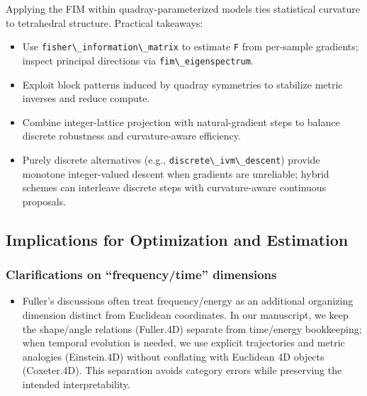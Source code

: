 \documentclass[
  10pt,
]{article}
\newcommand{\passthrough}[1]{#1}
\providecommand{\tightlist}{%
  \setlength{\itemsep}{0pt}\setlength{\parskip}{0pt}}
\begin{document}
Applying the FIM within quadray-parameterized models ties statistical
curvature to tetrahedral structure. Practical takeaways:

\begin{itemize}
\tightlist
\item
  Use \passthrough{\lstinline!fisher\_information\_matrix!} to estimate
  \passthrough{\lstinline!F!} from per-sample gradients; inspect
  principal directions via \passthrough{\lstinline!fim\_eigenspectrum!}.
\item
  Exploit block patterns induced by quadray symmetries to stabilize
  metric inverses and reduce compute.
\item
  Combine integer-lattice projection with natural-gradient steps to
  balance discrete robustness and curvature-aware efficiency.
\item
  Purely discrete alternatives (e.g.,
  \passthrough{\lstinline!discrete\_ivm\_descent!}) provide monotone
  integer-valued descent when gradients are unreliable; hybrid schemes
  can interleave discrete steps with curvature-aware continuous
  proposals.
\end{itemize}

\hypertarget{implications-for-optimization-and-estimation}{%
\subsection{Implications for Optimization and
Estimation}\label{implications-for-optimization-and-estimation}}

\hypertarget{clarifications-on-frequencytime-dimensions}{%
\subsubsection{Clarifications on ``frequency/time''
dimensions}\label{clarifications-on-frequencytime-dimensions}}

\begin{itemize}
\tightlist
\item
  Fuller's discussions often treat frequency/energy as an additional
  organizing dimension distinct from Euclidean coordinates. In our
  manuscript, we keep the shape/angle relations (Fuller.4D) separate
  from time/energy bookkeeping; when temporal evolution is needed, we
  use explicit trajectories and metric analogies (Einstein.4D) without
  conflating with Euclidean 4D objects (Coxeter.4D). This separation
  avoids category errors while preserving the intended interpretability.
\end{itemize}
\end{document}

